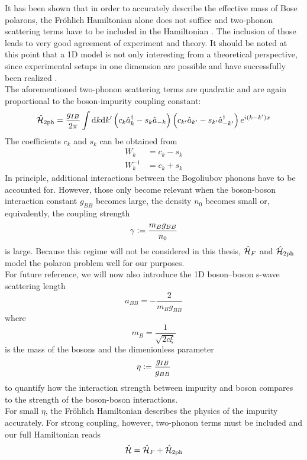 It has been shown that in order to accurately describe the effective mass of Bose polarons, the Fröhlich Hamiltonian alone does not suffice and two-phonon scattering terms have to be included in the Hamiltonian \cite{Grusdt_2017}. The inclusion of those leads to very good agreement of experiment and theory. It should be noted at this point that a 1D model is not only interesting from a theoretical perspective, since experimental setups in one dimension are possible and have successfully been realized \cite{Catani}.\\
The aforementioned two-phonon scattering terms are quadratic and are again proportional to the boson-impurity coupling constant:
\begin{equation}
\hat{\mathcal{H}}_{2\mathrm{ph}}=\frac{g_{IB}}{2\pi}\int\mathrm d k\mathrm d k^\prime \left(c_k\hat a^\dagger_k-s_k\hat a_{-k}\right)\left(c_{k^\prime}\hat a_{k^\prime}-s_{k^\prime}\hat a^\dagger_{-k^\prime}\right)e^{i(k-k^\prime)x}
\end{equation}
The coefficients $c_k$ and $s_k$ can be obtained from 
\begin{subequations}
\begin{align}
W_k &= c_k - s_k\\
W_k^{-1} &= c_k + s_k
\end{align}
\end{subequations}
In principle, additional interactions between the Bogoliubov phonons have to be accounted for. However, those only become relevant when the boson-boson interaction constant $g_{BB}$ becomes large, the density $n_0$ becomes small or, equivalently, the coupling strength \begin{equation}\gamma\vcentcolon=\frac{m_B g_{BB}}{n_0}\end{equation} is large. Because this regime will not be considered in this thesis, $\hat{\mathcal{H}}_F$ and $\hat{\mathcal{H}}_{2\mathrm{ph}}$ model the polaron problem well for our purposes.\\
For future reference, we will now also introduce the 1D boson–boson s-wave scattering length 
\begin{equation}
a_{BB}=-\frac{2}{m_Bg_{BB}}
\end{equation}
where \begin{equation}m_B = \frac{1}{\sqrt{2c\xi}}\end{equation} is the mass of the bosons
and the dimenionless parameter 
\begin{equation}
\eta\vcentcolon= \frac{g_{IB}}{g_{BB}}
\end{equation}
to quantify how the interaction strength between impurity and boson compares to the strength of the boson-boson interactions.\\
For small $\eta$, the Fröhlich Hamiltonian describes the physics of the impurity accurately. For strong coupling, however, two-phonon terms must be included and our full Hamiltonian reads
\begin{equation}\label{full_ham}
\hat{\mathcal{H}} = \hat{\mathcal{H}}_F + \hat{\mathcal{H}}_{2\mathrm{ph}}
\end{equation}
